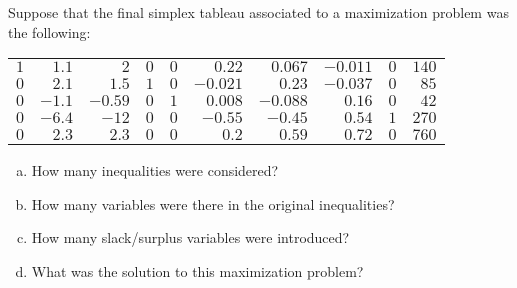 \documentclass[11pt,letterpaper]{article}
\begin{document}
\newpage



 Suppose that the final simplex tableau associated to a maximization problem was the following: \par
	\begin{table}[!ht]
	\centering
	\begin{tabular}{rrrrrrrrrr}
	$1$ & $1.1$ & $2$ & $0$ & $0$ & $0.22$ & $0.067$ & $-0.011$ & $0$ & $140$ \\
	$0$ & $2.1$ & $1.5$ & $1$ & $0$ & $-0.021$ & $0.23$ & $-0.037$ & $0$ & $85$ \\
	$0$ & $-1.1$ & $-0.59$ & $0$ & $1$ & $0.008$ & $-0.088$ & $0.16$ & $0$ & $42$ \\
	$0$ & $-6.4$ & $-12$ & $0$ & $0$ & $-0.55$ & $-0.45$ & $0.54$ & $1$ & $270$ \\
	$0$ & $2.3$ & $2.3$ & $0$ & $0$ & $0.2$ & $0.59$ & $0.72$ & $0$ & $760$ \\
	\end{tabular}
	\end{table}

\begin{enumerate}[(a)]
\item How many inequalities were considered?
\item How many variables were there in the original inequalities?
\item How many slack/surplus variables were introduced?
\item What was the solution to this maximization problem?
\end{enumerate} \pspace
\end{document}
